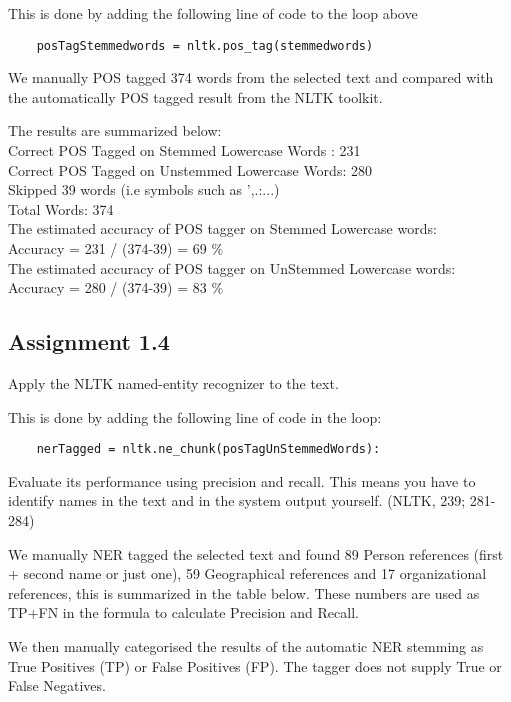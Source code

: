 \documentclass[a4paper]{article}
\begin{document}
This is done by adding the following line of code to the loop above
\begin{verbatim}
	posTagStemmedwords = nltk.pos_tag(stemmedwords)
\end{verbatim} 

We manually POS tagged 374 words from the selected text and compared with the automatically POS tagged result from the NLTK toolkit.

The results are summarized below: \\
Correct POS Tagged on Stemmed Lowercase Words  : 231 \\
Correct POS Tagged on Unstemmed Lowercase Words: 280 \\
Skipped 39 words (i.e symbols such as ',.:...) \\
Total Words: 374 \\
The estimated accuracy of POS tagger on Stemmed Lowercase words: \\
Accuracy = 231 / (374-39) = 69 \% \\
The estimated accuracy of POS tagger on UnStemmed Lowercase words: \\
Accuracy = 280 / (374-39) = 83 \% \\

\subsection{Assignment 1.4}
Apply the NLTK named-entity recognizer to the text.

This is done by adding the following line of code in the loop:

\begin{verbatim}
	nerTagged = nltk.ne_chunk(posTagUnStemmedWords):
\end{verbatim}

Evaluate its performance using precision and recall. This means you have to identify names in the text and in the system
output yourself. (NLTK, 239; 281-284)

We manually NER tagged the selected text and found 89 Person references (first + second name or just one), 59 Geographical 
references and 17 organizational references, this is summarized in the table below. These numbers are used as TP+FN in the 
formula to calculate Precision and Recall.

We then manually categorised the results of the automatic NER stemming as True Positives (TP) or False Positives (FP). 
The tagger does not supply True or False Negatives.
\end{document}
